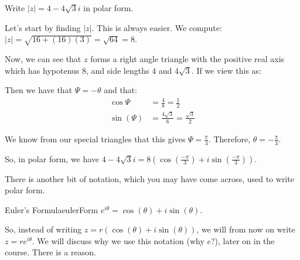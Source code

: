 \begin{ex}{}{} Write $|z| = 4 - 4\sqrt{3}i$ in polar form.

Let's start by finding $|z|$. This is always easier. We compute: $|z| = \sqrt{16 + (16)(3)} = \sqrt{64} = 8$.

Now, we can see that $z$ forms a right angle triangle with the positive real axis which has hypotenus $8$, and side lengths $4$ and $4\sqrt{3}$. If we view this as:

\begin{center}
\end{center}

Then we have that $\Psi = -\theta$ and that:
\begin{align*} \cos\Psi &= \frac{4}{8} = \frac{1}{2}\\
\sin(\Psi) &= \frac{4\sqrt{3}}{8} = \frac{\sqrt{3}}{2}
\end{align*}

We know from our special triangles that this gives $\Psi = \frac{\pi}{3}$. Therefore, $\theta = -\frac{\pi}{3}$.

So, in polar form, we have $4 - 4\sqrt{3}i = 8\left(\cos\left(\frac{-\pi}{3}\right) + i\sin\left(\frac{-\pi}{3}\right)\right)$.

\end{ex}

There is another bit of notation, which you may have come across, used to write polar form.

\begin{defbo}{Euler's Formula}{eulerForm} 
$e^{i\theta} = \cos(\theta) + i\sin(\theta)$.
\end{defbo}

So, instead of writing $z = r(\cos(\theta) + i\sin(\theta))$, we will from now on write $z = re^{i\theta}$. We will discuss why we use this notation (why $e$?), later on in the course. There is a reason.

